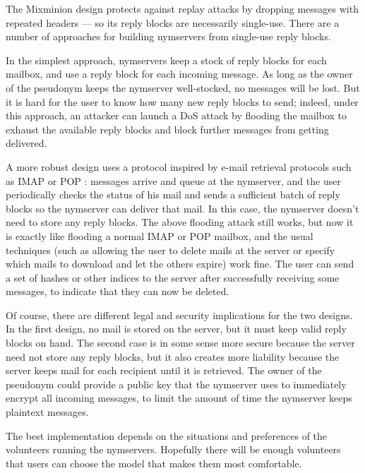 \documentclass{llncs}
\begin{document}
The Mixminion design protects against replay attacks by dropping
messages with repeated headers --- so its reply blocks are necessarily
single-use. There are a number of approaches for building nymservers
from single-use reply blocks.

In the simplest approach, nymservers keep a stock of reply blocks for
each mailbox, and use a reply block for each incoming message. As long
as the owner of the pseudonym keeps the nymserver well-stocked, no
messages will be lost.  But it is hard for the user to know how many
new reply blocks to send; indeed, under this approach, an attacker can
launch a DoS attack by flooding the mailbox to exhaust the available
reply blocks and block further messages from getting delivered.

A more robust design uses a protocol inspired by e-mail retrieval
protocols such as IMAP \cite{IMAP} or POP \cite{POP3}:
messages arrive and queue at the nymserver, and the user periodically
checks the status of his mail and sends a sufficient batch of reply
blocks so the nymserver can deliver that mail. 
In this case, the nymserver doesn't need to store any reply blocks.
The above flooding attack still works, but now it is exactly
like flooding a normal IMAP or POP mailbox, and the usual techniques (such as
allowing the user to delete mails at the server or specify which mails to
download and let the others expire) work fine. The user can send a set
of hashes or other indices to the server after successfully receiving
some messages, to indicate that they can now be deleted.

Of course, there are different legal and security implications for the two
designs. In the first design, no mail is stored on the server, but it must
keep valid reply blocks on hand. The second case is in some sense more
secure because the server need not store any reply blocks, but it also
creates more liability because the server keeps mail for each recipient
until it is retrieved. The owner of the pseudonym could provide a public
key that the nymserver uses to immediately encrypt all incoming messages,
to limit the amount of time the nymserver keeps plaintext messages.

The best implementation depends on the situations and preferences of
the volunteers running the nymservers. Hopefully there will be enough
volunteers that users can choose the model that makes them most
comfortable.
\end{document}
